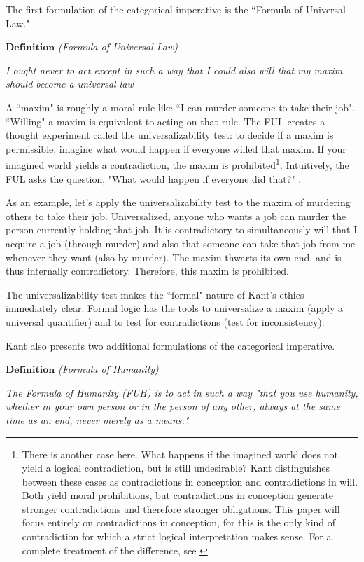 \begin{isabellebody}
\begin{isamarkuptext}
The first formulation of the categorical imperative is the ``Formula of Universal Law." 

$\textbf{Definition}$ \emph{(Formula of Universal Law)}

\emph{I ought never to act except in such a way that I could also will that my maxim should become a universal law} \cite{groundwork}

A ``maxim" is roughly a moral rule like ``I can murder someone to take their job". ``Willing" a maxim is 
equivalent to acting on that rule. The FUL creates a thought experiment called the universalizability 
test: to decide if a maxim is permissible, imagine what would happen if everyone willed that maxim. 
If your imagined world yields a contradiction, the maxim is prohibited\footnote{There is another case here.
What happens if the imagined world does not yield a logical contradiction, but is still undesirable? Kant 
distinguishes between these cases as contradictions in conception and contradictions in will. Both yield moral
prohibitions, but contradictions in conception generate stronger contradictions and therefore stronger obligations. 
This paper will focus entirely on contradictions in conception, for this is the only kind of contradiction 
for which a strict logical interpretation makes sense. For a complete treatment of the difference, see \cite{groundwork, KorsgaardFUL}}. Intuitively, the FUL asks 
the question, "What would happen if everyone did that?" \cite{KorsgaardFUL}. 

As an example, let's apply the universalizability test to the maxim of murdering others to take their job.
Universalized, anyone who wants a job can murder the person currently holding that job. It is contradictory
to simultaneously will that I acquire a job (through murder) and also that someone can take that job from me 
whenever they want (also by murder). The maxim thwarts its own end, and is thus internally contradictory.
 Therefore, this maxim is prohibited.

The universalizability test makes the ``formal" nature of Kant's ethics immediately clear. Formal 
logic has the tools to universalize a maxim (apply a universal quantifier) and to test for 
contradictions (test for inconsistency). 

Kant also presents two additional formulations of the categorical imperative. 

$\textbf{Definition}$ \emph{(Formula of Humanity)}

\emph{The Formula of Humanity (FUH)
is to act in such a way "that you use humanity, whether in your own person or in the person
of any other, always at the same time as an end, never merely as a means."}\cite{groundwork}


\end{isamarkuptext}
\end{isabellebody}
